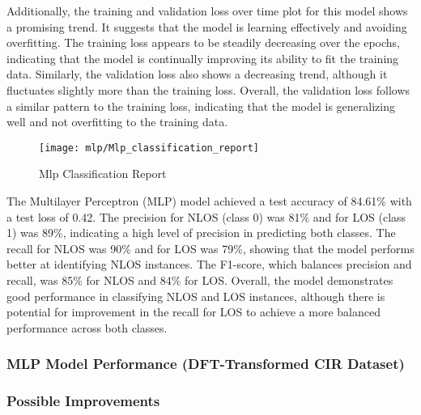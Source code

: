 Additionally, the training and validation loss over time plot for this model shows a promising trend. It suggests that the model is learning effectively and avoiding overfitting. The training loss appears to be steadily decreasing over the epochs, indicating that the model is continually improving its ability to fit the training data. Similarly, the validation loss also shows a decreasing trend, although it fluctuates slightly more than the training loss. Overall, the validation loss follows a similar pattern to the training loss, indicating that the model is generalizing well and not overfitting to the training data.

\begin{figure}[H] 
	\centering
	\texttt{[image: mlp/Mlp\_classification\_report]}
	\caption{Mlp Classification Report}\label{fig:mlp_classification_report}
\end{figure}

The Multilayer Perceptron (MLP) model achieved a test accuracy of 84.61\% with a test loss of 0.42. The precision for NLOS (class 0) was 81\% and for LOS (class 1) was 89\%, indicating a high level of precision in predicting both classes. The recall for NLOS was 90\% and for LOS was 79\%, showing that the model performs better at identifying NLOS instances. The F1-score, which balances precision and recall, was 85\% for NLOS and 84\% for LOS. Overall, the model demonstrates good performance in classifying NLOS and LOS instances, although there is potential for improvement in the recall for LOS to achieve a more balanced performance across both classes.

\subsubsection{MLP Model Performance (DFT-Transformed CIR Dataset)}


\subsubsection{Possible Improvements}

